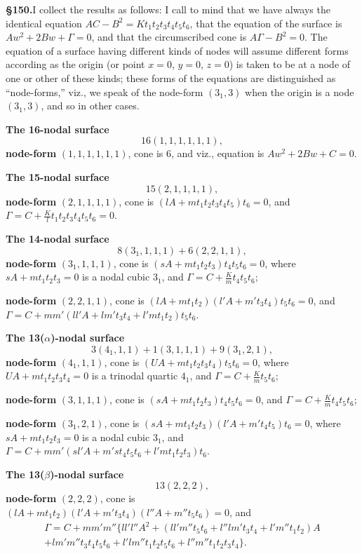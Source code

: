 \documentclass[11pt,a4paper]{article}
\begin{document}
\textbf{\S 150.}\quad I collect the results as follows: I call to mind that we have always the identical equation $AC - B^2 = Kt_1t_2t_3t_4t_5t_6$, that the equation of the surface is $Aw^2 + 2Bw + \Gamma = 0$, and that the circumscribed cone is $A\Gamma - B^2 = 0$. The equation of a surface having different kinds of nodes will assume different forms according as the origin (or point $x = 0$, $y = 0$, $z = 0$) is taken to be at a node of one or other of these kinds; these forms of the equations are distinguished as ``node-forms,'' viz., we speak of the node-form $(3_1, 3)$ when the origin is a node $(3_1, 3)$, and so in other cases.

\vspace{0.5em}
\textbf{The 16-nodal surface}
\[16(1, 1, 1, 1, 1, 1),\]
\textbf{node-form} $(1, 1, 1, 1, 1, 1)$, cone is $6$,
and viz., equation is $Aw^2 + 2Bw + C = 0$.

\vspace{0.5em}
\textbf{The 15-nodal surface}
\[15(2, 1, 1, 1, 1),\]
\textbf{node-form} $(2, 1, 1, 1, 1)$, cone is $(lA + mt_1t_2t_3t_4t_5)t_6 = 0$,
and $\Gamma = C + \frac{K}{l}t_1t_2t_3t_4t_5t_6 = 0$.

\vspace{0.5em}
\textbf{The 14-nodal surface}
\[8(3_1, 1, 1, 1) + 6(2, 2, 1, 1),\]
\textbf{node-form} $(3_1, 1, 1, 1)$, cone is $(sA + mt_1t_2t_3)t_4t_5t_6 = 0$,
where $sA + mt_1t_2t_3 = 0$ is a nodal cubic $3_1$,
and $\Gamma = C + \frac{K}{m}t_4t_5t_6$;

\textbf{node-form} $(2, 2, 1, 1)$,
cone is $(lA + mt_1t_2)(l'A + m't_3t_4)t_5t_6 = 0$,
and $\Gamma = C + mm'(ll'A + lm't_3t_4 + l'mt_1t_2)t_5t_6$.

\vspace{0.5em}
\textbf{The 13($\alpha$)-nodal surface}
\[3(4_1, 1, 1) + 1(3, 1, 1, 1) + 9(3_1, 2, 1),\]
\textbf{node-form} $(4_1, 1, 1)$,
cone is $(UA + mt_1t_2t_3t_4)t_5t_6 = 0$,
where $UA + mt_1t_2t_3t_4 = 0$ is a trinodal quartic $4_1$,
and $\Gamma = C + \frac{K}{m}t_5t_6$;

\textbf{node-form} $(3, 1, 1, 1)$,
cone is $(sA + mt_1t_2t_3)t_4t_5t_6 = 0$,
and $\Gamma = C + \frac{K}{m}t_4t_5t_6$;

\textbf{node-form} $(3_1, 2, 1)$,
cone is $(sA + mt_1t_2t_3)(l'A + m't_4t_5)t_6 = 0$,
where $sA + mt_1t_2t_3 = 0$ is a nodal cubic $3_1$,
and $\Gamma = C + mm'(sl'A + m'st_4t_5t_6 + l'mt_1t_2t_3)t_6$.

\vspace{0.5em}
\textbf{The 13($\beta$)-nodal surface}
\[13(2, 2, 2),\]
\textbf{node-form} $(2, 2, 2)$,
cone is $(lA + mt_1t_2)(l'A + m't_3t_4)(l''A + m''t_5t_6) = 0$,
and
\begin{multline*}
\Gamma = C + mm'm''\{ll'l''A^2 + (ll'm''t_5t_6 + l''lm't_3t_4 + l'm''t_1t_2)A \\
+ lm'm''t_3t_4t_5t_6 + l'lm''t_1t_2t_5t_6 + l''m''t_1t_2t_3t_4\}.
\end{multline*}
\end{document}
